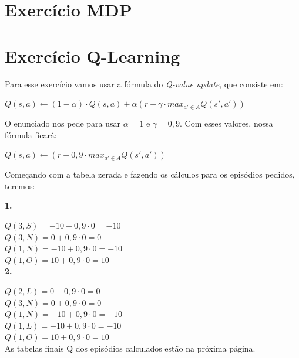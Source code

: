 \documentclass[12pt,letterpaper]{article}
\begin{document}
	\section*{Exercício MDP}

	\section*{Exercício Q-Learning}
	
	Para esse exercício vamos usar a fórmula do \textit{Q-value update}, que consiste em:
	
	\begin{center}
		$Q(s,a) \leftarrow (1-\alpha)\cdot Q(s,a) + \alpha(r+\gamma\cdot max_{a'\in A}Q(s',a'))$
	\end{center}
	
	O enunciado nos pede para usar $\alpha = 1$ e $\gamma = 0,9$. Com esses valores, nossa fórmula ficará: 
	
	\begin{center}
		$Q(s,a) \leftarrow (r+0,9\cdot max_{a'\in A}Q(s',a'))$
	\end{center}
	
	Começando com a tabela zerada e fazendo os cálculos para os episódios pedidos, teremos:
	
	\textbf{1.}
	
	$Q(3,S) = -10 + 0,9 \cdot 0 = -10$\\
	$Q(3,N) = 0 + 0,9 \cdot 0 = 0$\\
	$Q(1,N) = -10 + 0,9 \cdot 0 = -10$\\
	$Q(1,O) = 10 + 0,9 \cdot 0 = 10$\\
	
	\textbf{2.}
	
	$Q(2,L) = 0 + 0,9 \cdot 0 = 0$\\
	$Q(3,N) = 0 + 0,9 \cdot 0 = 0$\\
	$Q(1,N) = -10 + 0,9 \cdot 0 = -10$\\
	$Q(1,L) = -10 + 0,9 \cdot 0 = -10$\\	
	$Q(1,O) = 10 + 0,9 \cdot 0 = 10$\\
	
	As tabelas finais Q dos episódios calculados estão na próxima página.
	
	\newpage
\end{document}
